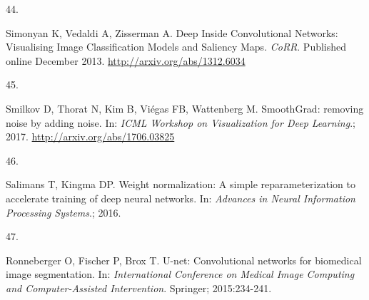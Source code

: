 \documentclass[
  12pt,
  a5,margin=2cmpaper,
]{article}
\newlength{\cslhangindent}
\newlength{\csllabelwidth}
\newlength{\cslentryspacingunit} %
\newenvironment{CSLReferences}[2] %
 {%
  \setlength{\parindent}{0pt}
  \ifodd #1
  \let\oldpar\par
  \def\par{\hangindent=\cslhangindent\oldpar}
  \fi
  \setlength{\parskip}{#2\cslentryspacingunit}
 }%
 {}
\newcommand{\CSLLeftMargin}[1]{\parbox[t]{\csllabelwidth}{#1}}
\newcommand{\CSLRightInline}[1]{\parbox[t]{\linewidth - \csllabelwidth}{#1}\break}
\begin{document}
\begin{CSLReferences}{0}{0}
\leavevmode{}%
\CSLLeftMargin{44. }%
\CSLRightInline{Simonyan K, Vedaldi A, Zisserman A. {Deep Inside
Convolutional Networks: Visualising Image Classification Models and
Saliency Maps}. \emph{CoRR}. Published online December 2013.
\url{http://arxiv.org/abs/1312.6034}}

\leavevmode{}%
\CSLLeftMargin{45. }%
\CSLRightInline{Smilkov D, Thorat N, Kim B, Viégas FB, Wattenberg M.
{SmoothGrad: removing noise by adding noise}. In: \emph{ICML Workshop on
Visualization for Deep Learning}.; 2017.
\url{http://arxiv.org/abs/1706.03825}}

\leavevmode{}%
\CSLLeftMargin{46. }%
\CSLRightInline{Salimans T, Kingma DP. {Weight normalization: A simple
reparameterization to accelerate training of deep neural networks}. In:
\emph{Advances in Neural Information Processing Systems}.; 2016.}

\leavevmode{}%
\CSLLeftMargin{47. }%
\CSLRightInline{Ronneberger O, Fischer P, Brox T. {U-net: Convolutional
networks for biomedical image segmentation}. In: \emph{International
Conference on Medical Image Computing and Computer-Assisted
Intervention}. Springer; 2015:234-241.}

\end{CSLReferences}
\end{document}
